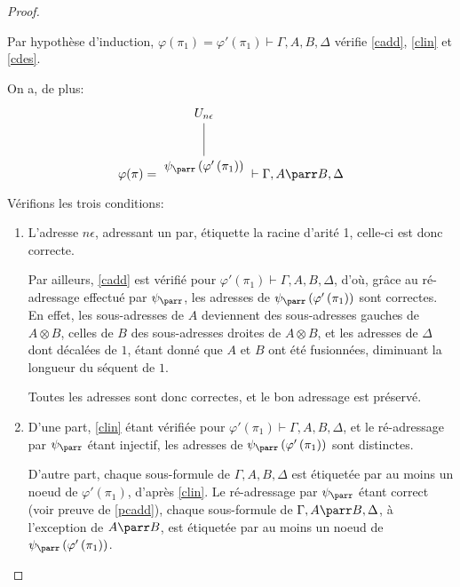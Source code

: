 \documentclass[11pt,a4paper]{article}
\theoremstyle{plain}
\theoremstyle{definition}
\theoremstyle{remark}
\newcommand*{\tensor}{\otimes}
\newcommand*{\someproof}{\pi}
\newcommand*{\sequent}{\Gamma}
\newcommand*{\sequentbis}{\Delta}
\newcommand*{\encode}{\ensuremath{\varphi}}
\begin{document}
\begin{proof}
\begin{description}
    Par hypothèse d'induction, $\encode \left( \pi_1 \right) = \encode ' \left( \pi_1 \right) \vdash \sequent, A, B, \sequentbis$ vérifie \ref{cadd}, \ref{clin} et \ref{cdes}.
    
    On a, de plus:
    \begin{equation*}
    \encode ( \someproof ) = \begin{tikzpicture}%
    [level distance=1.5cm,
    level 2/.style={sibling distance=3.5cm}]
    \node {$U_{n \epsilon}$}
        child {node {$\psi_\parr \left( \encode' \left( \pi_1 \right) \right)$}
    };
    \end{tikzpicture} \vdash \sequent, A \parr B, \sequentbis
    \end{equation*}

    Vérifions les trois conditions:
    \begin{enumerate}
        \item\label{pcadd} L'adresse $n \epsilon$, adressant un par, étiquette la racine d'arité 1, celle-ci est donc correcte.
        
        Par ailleurs, \ref{cadd} est vérifié pour $\encode ' \left( \pi_1 \right) \vdash \sequent, A, B, \sequentbis$, d'où, grâce au ré-adressage effectué par $\psi_\parr$, les adresses de $\psi_\parr \left( \encode' \left( \pi_1 \right) \right)$ sont correctes. En effet, les sous-adresses de $A$ deviennent des sous-adresses gauches de $A \tensor B$, celles de $B$ des sous-adresses droites de $A \tensor B$, et les adresses de $\sequentbis$ dont décalées de $1$, étant donné que $A$ et $B$ ont été fusionnées, diminuant la longueur du séquent de $1$.
        
        Toutes les adresses sont donc correctes, et le bon adressage est préservé.
        
        \item D'une part, \ref{clin} étant vérifiée pour $\encode ' \left( \pi_1 \right) \vdash \sequent, A, B, \sequentbis$, et le ré-adressage par $\psi_\parr$ étant injectif, les adresses de $\psi_\parr \left( \encode' \left( \pi_1 \right) \right)$ sont distinctes.
        
        D'autre part, chaque sous-formule de $\sequent, A, B, \sequentbis$ est étiquetée par au moins un noeud de $\encode ' \left( \pi_1 \right)$, d'après \ref{clin}. Le ré-adressage par $\psi_\parr$ étant correct (voir preuve de \ref{pcadd}), chaque sous-formule de $\sequent, A \parr B, \sequentbis$, à l'exception de $A \parr B$, est étiquetée par au moins un noeud de $\psi_\parr \left( \encode' \left( \pi_1 \right) \right)$.
        

\end{enumerate}
\end{description}
\end{proof}
\end{document}
